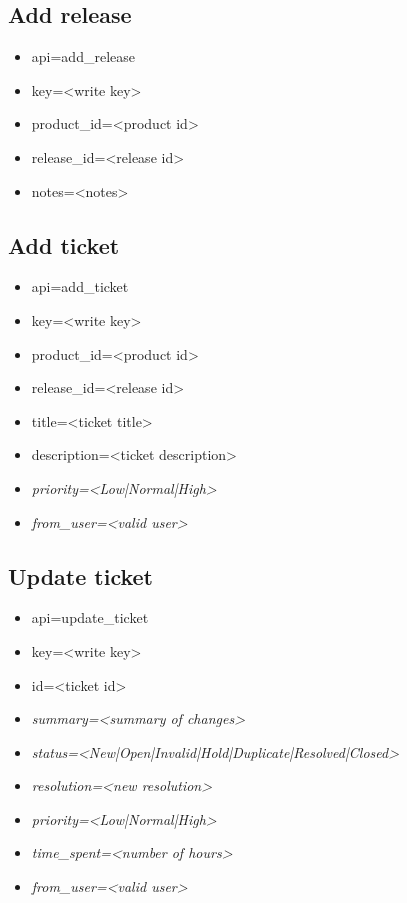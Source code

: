 \documentclass[11pt]{article}
\begin{document}
\subsection{Add release}

\begin{itemize}
\item api=add\_release
\item key=<write key>
\item product\_id=<product id>
\item release\_id=<release id>
\item notes=<notes>
\end{itemize}

\subsection{Add ticket}

\begin{itemize}
\item api=add\_ticket
\item key=<write key>
\item product\_id=<product id>
\item release\_id=<release id>
\item title=<ticket title>
\item description=<ticket description>
\item \textit{priority=<Low|Normal|High>}
\item \textit{from\_user=<valid user>}
\end{itemize}

\subsection{Update ticket}

\begin{itemize}
\item api=update\_ticket
\item key=<write key>
\item id=<ticket id>
\item \textit{summary=<summary of changes>}
\item \textit{status=<New|Open|Invalid|Hold|Duplicate|Resolved|Closed>}
\item \textit{resolution=<new resolution>}
\item \textit{priority=<Low|Normal|High>}
\item \textit{time\_spent=<number of hours>}
\item \textit{from\_user=<valid user>}
\end{itemize}
\end{document}

